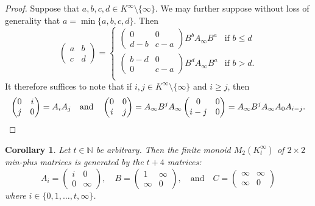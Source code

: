 \documentclass{amsart}
\newcommand{\N}{\mathbb{N}}
\numberwithin{equation}{section}
\newtheorem{cor}[equation]{Corollary}
\theoremstyle{definition}
\begin{document}
\begin{proof}
  Suppose that $a, b, c, d\in K^{\infty} \setminus \{\infty\}$. We may further
  suppose without loss of generality that $a = \min\{a,b,c,d\}$. Then 
  \begin{equation*}
    \begin{pmatrix}
      a & b \\
      c & d
    \end{pmatrix}
    = 
    \begin{cases}
      \begin{pmatrix}
        0     & 0 \\
        d - b & c- a
      \end{pmatrix}
       B ^ b A_{\infty} B ^ a & \text{if } b\leq d \\
      \begin{pmatrix}
        b - d & 0     \\
        0     & c - a 
      \end{pmatrix}
       B ^ d A_{\infty} B ^ a & \text{if } b > d. \\
    \end{cases}
  \end{equation*}
  It therefore suffices to note that if $i, j\in K^{\infty} \setminus
  \{\infty\}$ and
  $i \geq j$, then 
  \begin{equation*}
    \begin{pmatrix}
      0 & i \\
      j & 0
    \end{pmatrix}
    = 
    A_i A_j
    \quad \text{and} \quad
    \begin{pmatrix}
      0 & 0 \\
      i & j
    \end{pmatrix}
    = 
    A_{\infty} B ^ j A_{\infty} 
    \begin{pmatrix}
      0     & 0 \\
      i - j & 0
    \end{pmatrix}
    = 
    A_{\infty} B ^ j A_{\infty} A_0 A_{i - j}.\qedhere
  \end{equation*}
\end{proof}

\begin{cor}
  \label{cor-finite-min-plus}
  Let $t\in \N$ be arbitrary. Then the finite monoid $M_2(K^{\infty}_t)$ of $2
  \times 2$ min-plus matrices is generated by the $t + 4$ matrices:
  \begin{equation*}
    A_i = 
    \begin{pmatrix}
      i & 0      \\
      0 & \infty
    \end{pmatrix},
    \quad
    B = 
    \begin{pmatrix}
      1      & \infty \\
      \infty & 0
    \end{pmatrix},
    \quad 
    \text{and}
    \quad
    C = 
    \begin{pmatrix}
      \infty & \infty \\
      \infty & 0
    \end{pmatrix}
  \end{equation*}
  where $i\in \{0, 1, \ldots, t, \infty\}$.
\end{cor}
\end{document}
